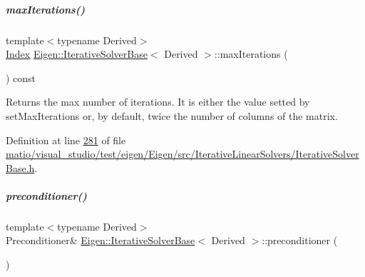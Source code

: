 \mbox{\label{group___iterative_linear_solvers___module_a168a74c8dceb6233b220031fdd756ba0}} 
\subparagraph{\texorpdfstring{max\+Iterations()}{maxIterations()}\hspace{0.1cm}{\footnotesize\ttfamily [2/2]}}
{\footnotesize\ttfamily template$<$typename Derived$>$ \\
\hyperlink{namespace_eigen_a62e77e0933482dafde8fe197d9a2cfde}{Index} \hyperlink{group___iterative_linear_solvers___module_class_eigen_1_1_iterative_solver_base}{Eigen\+::\+Iterative\+Solver\+Base}$<$ Derived $>$\+::max\+Iterations (\begin{DoxyParamCaption}{ }\end{DoxyParamCaption}) const\hspace{0.3cm}{\ttfamily [inline]}}

\begin{DoxyReturn}{Returns}
the max number of iterations. It is either the value setted by set\+Max\+Iterations or, by default, twice the number of columns of the matrix. 
\end{DoxyReturn}


Definition at line \hyperlink{matio_2visual__studio_2test_2eigen_2_eigen_2src_2_iterative_linear_solvers_2_iterative_solver_base_8h_source_l00281}{281} of file \hyperlink{matio_2visual__studio_2test_2eigen_2_eigen_2src_2_iterative_linear_solvers_2_iterative_solver_base_8h_source}{matio/visual\+\_\+studio/test/eigen/\+Eigen/src/\+Iterative\+Linear\+Solvers/\+Iterative\+Solver\+Base.\+h}.

\mbox{\label{group___iterative_linear_solvers___module_a5e88f2a323a2900205cf807af94f8051}} 
\subparagraph{\texorpdfstring{preconditioner()}{preconditioner()}\hspace{0.1cm}{\footnotesize\ttfamily [1/4]}}
{\footnotesize\ttfamily template$<$typename Derived$>$ \\
Preconditioner\& \hyperlink{group___iterative_linear_solvers___module_class_eigen_1_1_iterative_solver_base}{Eigen\+::\+Iterative\+Solver\+Base}$<$ Derived $>$\+::preconditioner (\begin{DoxyParamCaption}{ }\end{DoxyParamCaption})\hspace{0.3cm}{\ttfamily [inline]}}

